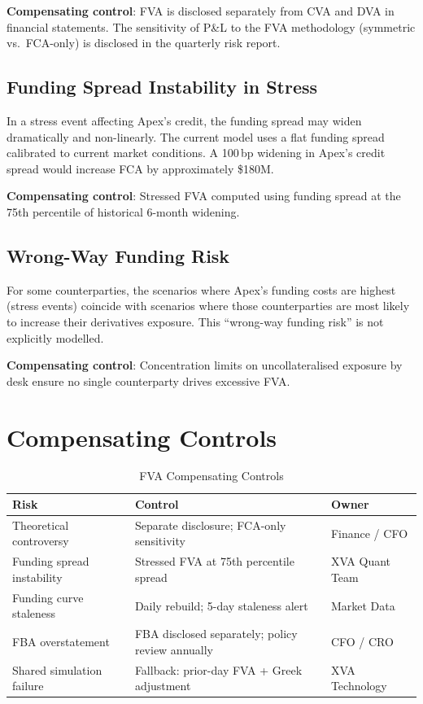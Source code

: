 \documentclass[11pt,a4paper]{article}
\begin{document}
\textbf{Compensating control}: FVA is disclosed separately from CVA and DVA in financial
statements. The sensitivity of P\&L to the FVA methodology (symmetric vs.\ FCA-only) is
disclosed in the quarterly risk report.

\subsection{Funding Spread Instability in Stress}

In a stress event affecting Apex's credit, the funding spread may widen dramatically and
non-linearly. The current model uses a flat funding spread calibrated to current market
conditions. A 100\,bp widening in Apex's credit spread would increase FCA by approximately
\$180M.

\textbf{Compensating control}: Stressed FVA computed using funding spread at the 75th
percentile of historical 6-month widening.

\subsection{Wrong-Way Funding Risk}

For some counterparties, the scenarios where Apex's funding costs are highest (stress events)
coincide with scenarios where those counterparties are most likely to increase their derivatives
exposure. This ``wrong-way funding risk'' is not explicitly modelled.

\textbf{Compensating control}: Concentration limits on uncollateralised exposure by desk ensure
no single counterparty drives excessive FVA.

\section{Compensating Controls}

\begin{table}[h!]
\centering
\caption{FVA Compensating Controls}
\begin{tabular}{@{}p{4.5cm}p{6cm}p{3.5cm}@{}}
\toprule
\textbf{Risk} & \textbf{Control} & \textbf{Owner} \\
\midrule
Theoretical controversy & Separate disclosure; FCA-only sensitivity & Finance / CFO \\[4pt]
Funding spread instability & Stressed FVA at 75th percentile spread & XVA Quant Team \\[4pt]
Funding curve staleness & Daily rebuild; 5-day staleness alert & Market Data \\[4pt]
FBA overstatement & FBA disclosed separately; policy review annually & CFO / CRO \\[4pt]
Shared simulation failure & Fallback: prior-day FVA + Greek adjustment & XVA Technology \\
\bottomrule
\end{tabular}
\end{table}
\end{document}
